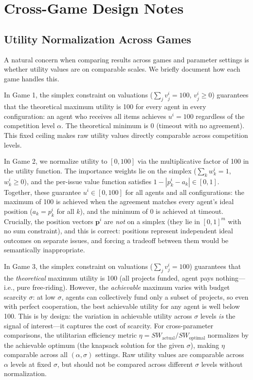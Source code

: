 \section{Cross-Game Design Notes}
\label{sec:cross_game_notes}

\subsection{Utility Normalization Across Games}
\label{sec:normalization}

A natural concern when comparing results across games and parameter settings is whether utility values are on comparable scales.
We briefly document how each game handles this.

In Game 1, the simplex constraint on valuations ($\sum_j v^i_j = 100$, $v^i_j \geq 0$) guarantees that the theoretical maximum utility is 100 for every agent in every configuration: an agent who receives all items achieves $u^i = 100$ regardless of the competition level $\alpha$.
The theoretical minimum is 0 (timeout with no agreement).
This fixed ceiling makes raw utility values directly comparable across competition levels.

In Game 2, we normalize utility to $[0, 100]$ via the multiplicative factor of 100 in the utility function.
The importance weights lie on the simplex ($\sum_k w^i_k = 1$, $w^i_k \geq 0$), and the per-issue value function satisfies $1 - |p^i_k - a_k| \in [0, 1]$.
Together, these guarantee $u^i \in [0, 100]$ for all agents and all configurations: the maximum of 100 is achieved when the agreement matches every agent's ideal position ($a_k = p^i_k$ for all $k$), and the minimum of 0 is achieved at timeout.
Crucially, the position vectors $\bm{p}^i$ are \emph{not} on a simplex (they lie in $[0,1]^m$ with no sum constraint), and this is correct: positions represent independent ideal outcomes on separate issues, and forcing a tradeoff between them would be semantically inappropriate.

In Game 3, the simplex constraint on valuations ($\sum_j v^i_j = 100$) guarantees that the \emph{theoretical} maximum utility is 100 (all projects funded, agent pays nothing---i.e., pure free-riding).
However, the \emph{achievable} maximum varies with budget scarcity $\sigma$: at low $\sigma$, agents can collectively fund only a subset of projects, so even with perfect cooperation, the best achievable utility for any agent is well below 100.
This is by design: the variation in achievable utility across $\sigma$ levels \emph{is} the signal of interest---it captures the cost of scarcity.
For cross-parameter comparisons, the utilitarian efficiency metric $\eta = SW_{\text{actual}} / SW_{\text{optimal}}$ normalizes by the achievable optimum (the knapsack solution for the given $\sigma$), making $\eta$ comparable across all $(\alpha, \sigma)$ settings.
Raw utility values are comparable across $\alpha$ levels at fixed $\sigma$, but should not be compared across different $\sigma$ levels without normalization.

